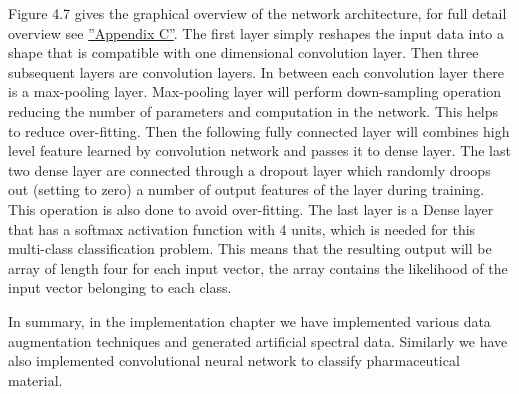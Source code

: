 Figure 4.7 gives the graphical overview of the network architecture, for full detail overview see \hyperref[fig:neural network architecture]{''Appendix C''}. The first layer simply reshapes the input data into a shape that is compatible with one dimensional convolution layer. Then three subsequent layers are convolution layers. In between each convolution layer there is a max-pooling layer. Max-pooling layer will perform down-sampling operation reducing the number of parameters and computation in the network. This helps to reduce over-fitting. Then the following fully connected layer will combines high level feature learned by convolution network and passes it to dense layer. The last two dense layer are connected through a dropout layer which randomly droops out (setting to zero) a number of output features of the layer during training. This operation is also done to avoid over-fitting. The last layer is a Dense layer that has a softmax activation function with 4 units, which is needed for this multi-class classification problem. This means that the resulting output will be array of length four for each input vector, the array contains the likelihood of the input vector belonging to each class.

In summary, in the implementation chapter we have implemented various data augmentation techniques and generated artificial spectral data. Similarly we have also implemented convolutional neural network to classify pharmaceutical material. 